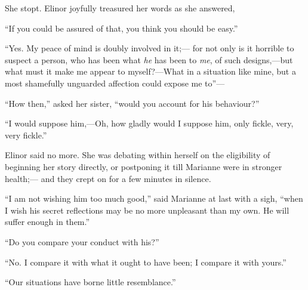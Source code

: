 \documentclass{article}
\begin{document}
She stopt.  Elinor joyfully treasured her words
as she answered,

``If you could be assured of that, you think you
should be easy.''

``Yes. My peace of mind is doubly involved in it;---%
for not only is it horrible to suspect a person, who has
been what \emph{he} has been to \emph{me}, of such designs,---but what must
it make me appear to myself?---What in a situation like mine,
but a most shamefully unguarded affection could expose
me to''---%

``How then,'' asked her sister, ``would you account
for his behaviour?''

``I would suppose him,---Oh, how gladly would I suppose him,
only fickle, very, very fickle.''

Elinor said no more.  She was debating within herself
on the eligibility of beginning her story directly,
or postponing it till Marianne were in stronger health;---%
and they crept on for a few minutes in silence.

``I am not wishing him too much good,'' said Marianne
at last with a sigh, ``when I wish his secret reflections
may be no more unpleasant than my own.  He will suffer
enough in them.''

``Do you compare your conduct with his?''

``No. I compare it with what it ought to have been;
I compare it with yours.''

``Our situations have borne little resemblance.''
\end{document}

